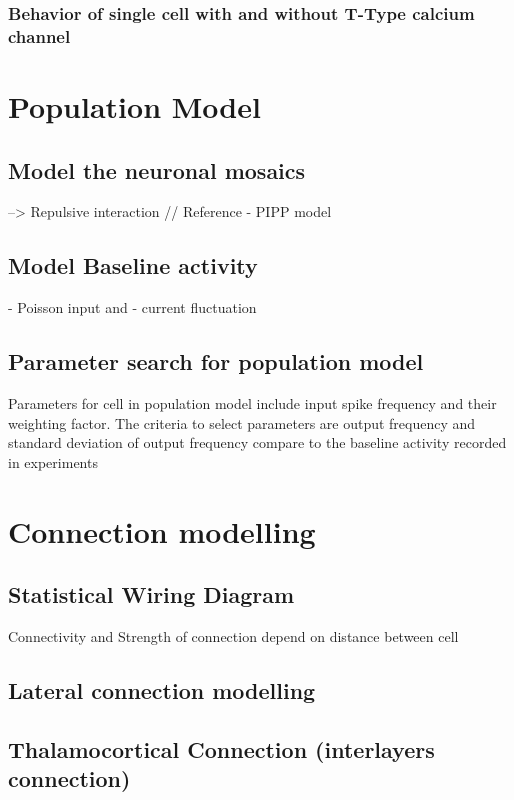 \subsubsection{Behavior of single cell with and without T-Type calcium channel}


\section{Population Model}
\subsection{Model the neuronal mosaics}
 --> Repulsive interaction  // Reference - PIPP model 
 \subsection{Model Baseline activity}
 - Poisson input 
 and 
 - current fluctuation 
 \subsection{Parameter search for population model}
 Parameters for cell in population model include input spike frequency and their weighting factor. 
 The criteria to select parameters are output frequency and standard deviation of output frequency compare to the baseline activity recorded in experiments


\section{Connection modelling }

\subsection{Statistical Wiring Diagram}
Connectivity and  Strength of connection depend on distance between cell\cite{ringach2004haphazard,mclaughlin2000neuronal}
\cite{mclaughlin2000neuronal}

\subsection{Lateral connection modelling}


\subsection{Thalamocortical Connection (interlayers connection)}


